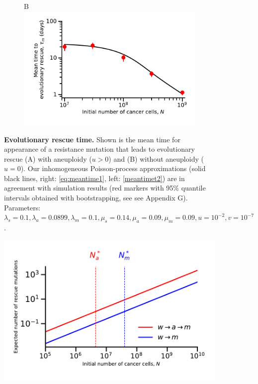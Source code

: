 \documentclass[12pt]{extarticle}
\begin{document}
\begin{appendices}
\begin{figure}[!htb]
\begin{subfigure}{0.5\textwidth}
\end{subfigure}
\begin{subfigure}{0.5\textwidth}
B\\
\includegraphics[width=1\textwidth]{Figures/MeanTimeGrowthMutantDirectPlot.pdf}
\end{subfigure}
\caption{\textbf{Evolutionary rescue time.}
Shown is the mean time for appearance of a resistance mutation that leads to evolutionary rescue (A) with aneuploidy ($u>0$) and (B) without aneuploidy ($u=0$).
Our inhomogeneous Poisson-process approximations (solid black lines, right: \cref{eq:meantime1}, left: \cref{meantimet2}) are in agreement with simulation results (red markers with 95\% quantile intervals obtained with bootstrapping, see see Appendix G). 
Parameters: $\lambda_s=0.1,\lambda_a=0.0899,\lambda_m=0.1,\mu_s=0.14,\mu_a=0.09,\mu_m=0.09, u=10^{-2}, v=10^{-7}$. %
}
\label{MeanTimeGrowthAneuploidyPlot} 
\end{figure}
\begin{figure}
\vspace*{1\baselineskip}
\includegraphics[width=1\textwidth]{Figures/ExpectedNumber.pdf}

\end{figure}
\end{appendices}
\end{document}
